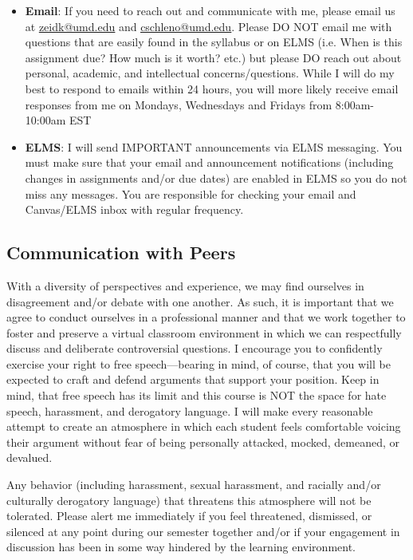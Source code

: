 \documentclass[11pt,usenames,dvipsnames,svgnames,x11names,letterpaper]{article}
\newcommand{\urllink}[2]{\href{#1}{\textcolor{Tomato3}{{{\tiny\faChevronRight}\uline{#2}}}}}
\begin{document}
\begin{itemize}
    \item \textbf{Email}: If you need to reach out and communicate with me, please email us at \urllink{mailto:zeidk@umd.edu}{zeidk@umd.edu} and \urllink{mailto:cschleno@umd.edu}{cschleno@umd.edu}. Please DO NOT email me with questions that are easily found in the syllabus or on ELMS (i.e. When is this assignment due? How
much is it worth? etc.) but please DO reach out about personal, academic, and intellectual concerns/questions. While I will do my best to respond to emails within 24 hours, you will more likely receive email responses from me
on Mondays, Wednesdays and Fridays from 8:00am-10:00am EST
    \item  \textbf{ELMS}: I will send IMPORTANT announcements via ELMS messaging. You must make sure that your email and announcement notifications (including changes in assignments and/or due dates) are enabled in ELMS so you do not miss any messages. You are responsible for checking your email and Canvas/ELMS inbox with regular
frequency.
\end{itemize}

\subsection{Communication with Peers}
With a diversity of perspectives and experience, we may find ourselves in disagreement and/or debate with one
another. As such, it is important that we agree to conduct ourselves in a professional manner and that we work
together to foster and preserve a virtual classroom environment in which we can respectfully discuss and deliberate
controversial questions. I encourage you to confidently exercise your right to free speech—bearing in mind, of
course, that you will be expected to craft and defend arguments that support your position. Keep in mind, that free
speech has its limit and this course is NOT the space for hate speech, harassment, and derogatory language. I will
make every reasonable attempt to create an atmosphere in which each student feels comfortable voicing their
argument without fear of being personally attacked, mocked, demeaned, or devalued.

\vspace{0.3cm}

Any behavior (including harassment, sexual harassment, and racially and/or culturally derogatory language) that
threatens this atmosphere will not be tolerated. Please alert me immediately if you feel threatened, dismissed, or silenced at any point during our semester together and/or if your engagement in discussion has been in some way
hindered by the learning environment.
\end{document}
